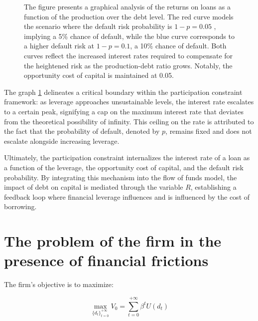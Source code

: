 \documentclass[12pt]{report}
\begin{document}
\begin{figure}
    \caption{The figure presents a graphical analysis of the returns on loans as a function of the production over the
    debt level. The red curve models the scenario where the default risk probability is 
    \(1-p=0.05\)
    , implying a 5\% chance of default, while the blue curve corresponds to a higher default risk at 
    \(1-p=0.1\), a 10\% chance of default. Both curves reflect the increased interest rates required to compensate for
    the heightened risk as the production-debt ratio grows. Notably, the opportunity cost of capital is maintained at 0.05.
    }
    \label{plot:part_constraint_r_fixlavarge}
\end{figure}
The graph \ref{plot:part_constraint_r_fixlavarge} delineates a critical boundary within the participation constraint framework: as leverage approaches
unsustainable levels, the interest rate escalates to a certain peak, signifying a cap on the maximum interest rate that
deviates from the theoretical possibility of infinity. This ceiling on the rate is attributed to the fact that the
probability of default, denoted by \( p \), remains fixed and does not escalate alongside increasing leverage. 

Ultimately, the participation constraint internalizes the interest rate of a loan as a function of the leverage, the
opportunity cost of capital, and the default risk probability. By integrating this mechanism into the flow of funds
model, the impact of debt on capital is mediated through the variable \( R \), establishing a feedback loop where
financial leverage influences and is influenced by the cost of borrowing. 




\section{The problem of the firm in the presence of financial frictions}
 The firm's objective is to maximize:

\[
\max_{{\{d_{t}\}}_{t=0}^{+\infty}}V_0 = \sum_{t=0}^{+\infty}{\beta^t U(d_t)}
\]
\end{document}

